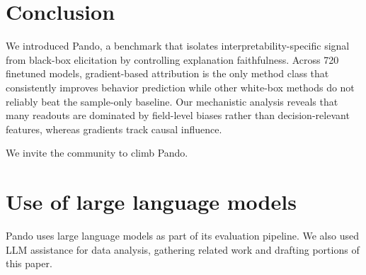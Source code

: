 \documentclass{article} %
\newcommand{\Cref}[1]{\ref{##1}}
\newcommand{\crefalias}[2]{}
\newcommand{\bench}{Pando}
\begin{document}


\section{Conclusion}
\label{sec:discussion}

We introduced \bench{}, a benchmark that isolates interpretability-specific signal from black-box elicitation by controlling explanation faithfulness. Across 720 finetuned models, gradient-based attribution is the only method class that consistently improves behavior prediction while other white-box methods do not reliably beat the sample-only baseline. Our mechanistic analysis reveals that many readouts are dominated by field-level biases rather than decision-relevant features, whereas gradients track causal influence. %

We invite the community to climb \bench{}.




\newpage




\newpage
\appendix
\crefalias{section}{appendix}

\section*{Use of large language models}
\bench{} uses large language models as part of its evaluation pipeline. We also used LLM assistance for data analysis, gathering related work and drafting portions of this paper.
\end{document}
